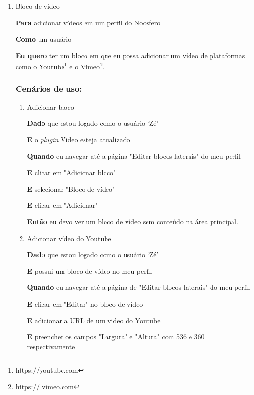 \begin{enumerate}

\item Bloco de video

\textbf{Para} adicionar vídeos em um perfil do Noosfero

\textbf{Como} um usuário

\textbf{Eu quero} ter um bloco em que eu possa adicionar um vídeo de plataformas
como o Youtube\footnote{\url{https://youtube.com}} e o Vimeo\footnote{\url{https://
vimeo.com}}.

\subsubsection*{Cenários de uso:}

\begin{enumerate}

\item Adicionar bloco

\textbf{Dado} que estou logado como o usuário `Zé'

\textbf{E} o \textit{plugin} Video esteja atualizado

\textbf{Quando} eu navegar até a página "Editar blocos laterais" do meu perfil

\textbf{E} clicar em "Adicionar bloco"

\textbf{E} selecionar "Bloco de vídeo"

\textbf{E} clicar em "Adicionar"

\textbf{Então} eu devo ver um bloco de vídeo sem conteúdo na área principal.


\item Adicionar vídeo do Youtube

\textbf{Dado} que estou logado como o usuário `Zé'

\textbf{E} possui um bloco de vídeo no meu perfil

\textbf{Quando} eu navegar até a página de "Editar blocos laterais" do meu perfil

\textbf{E} clicar em "Editar" no bloco de vídeo

\textbf{E} adicionar a URL de um video do Youtube

\textbf{E} preencher os campos "Largura" e "Altura" com 536 e 360
respectivamente


\end{enumerate}
\end{enumerate}

